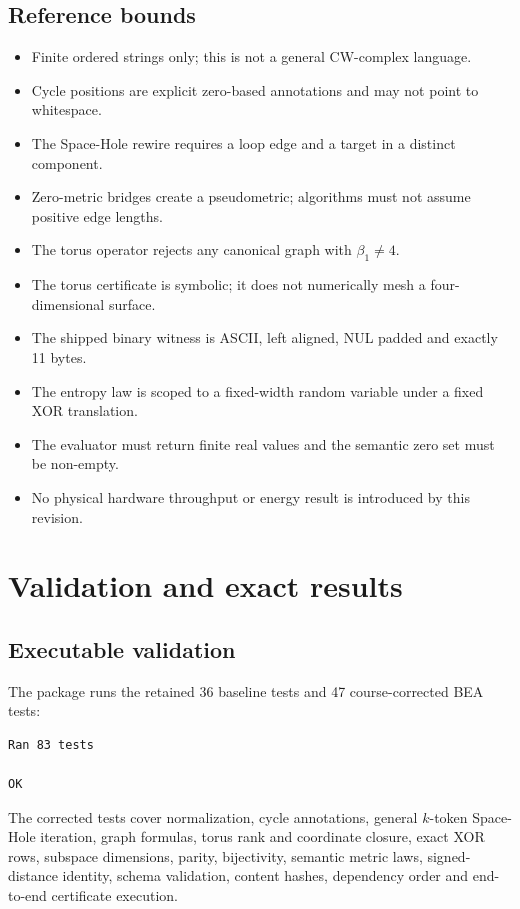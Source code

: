 \documentclass[10pt,a4paper]{article}
\newcommand{\bettiOne}{\beta_1}
\begin{document}
\subsection{Reference bounds}
\begin{itemize}
\item Finite ordered strings only; this is not a general CW-complex language.
\item Cycle positions are explicit zero-based annotations and may not point to whitespace.
\item The Space-Hole rewire requires a loop edge and a target in a distinct component.
\item Zero-metric bridges create a pseudometric; algorithms must not assume positive edge lengths.
\item The torus operator rejects any canonical graph with $\bettiOne\neq4$.
\item The torus certificate is symbolic; it does not numerically mesh a four-dimensional surface.
\item The shipped binary witness is ASCII, left aligned, NUL padded and exactly 11 bytes.
\item The entropy law is scoped to a fixed-width random variable under a fixed XOR translation.
\item The evaluator must return finite real values and the semantic zero set must be non-empty.
\item No physical hardware throughput or energy result is introduced by this revision.
\end{itemize}

\section{Validation and exact results}

\subsection{Executable validation}
The package runs the retained 36 baseline tests and 47 course-corrected BEA tests:
\begin{Verbatim}[fontsize=\small]
Ran 83 tests

OK
\end{Verbatim}
The corrected tests cover normalization, cycle annotations, general $k$-token Space-Hole iteration, graph formulas, torus rank and coordinate closure, exact XOR rows, subspace dimensions, parity, bijectivity, semantic metric laws, signed-distance identity, schema validation, content hashes, dependency order and end-to-end certificate execution.
\end{document}
